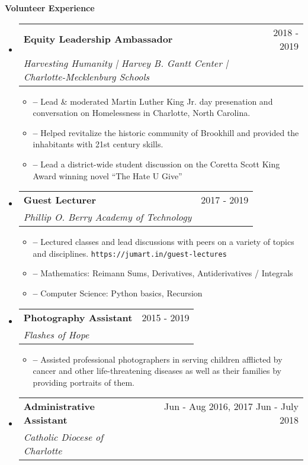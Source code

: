 \documentclass[letterpaper,10pt,draft]{article}
\makeatletter
\newlength{\outerbordwidth}
\newcommand{\resitem}[1]{\item[] \textbf{--} #1 \vspace{-2pt}}
\newcommand{\resheading}[1]{\vspace{8pt}
  {\setlength{\FrameSep}{\outerbordwidth}
    
\textbf{\large #1}
    
  }
}
\newcommand{\ressubheading}[3]{
\begin{tabular*}{6.5in}{l@{\cftdotfill{\cftsecdotsep}\extracolsep{\fill}}r}
		\textbf{#1} & #3\\
		\textit{#2} \\
\end{tabular*}\vspace{-6pt}}
\makeatother
\begin{document}
\resheading{Volunteer Experience}
\begin{itemize}

	\item[]
	  \ressubheading{Equity Leadership Ambassador}{Harvesting Humanity | Harvey B. Gantt Center | Charlotte-Mecklenburg Schools}{2018 - 2019}

	  \begin{itemize}

	    \resitem{Lead \& moderated Martin Luther King Jr. day presenation and conversation on Homelessness in Charlotte, North Carolina.}

	    \resitem{Helped revitalize the historic community of Brookhill and provided the inhabitants with 21st century skills.}

	    \resitem{Lead a district-wide student discussion on the Coretta Scott King Award winning novel ``The Hate U Give''}

	   \end{itemize}

	\item[]
	  \ressubheading{Guest Lecturer}{Phillip O. Berry Academy of Technology}{2017 - 2019}

	  \begin{itemize}

	    \resitem{Lectured classes and lead discussions with peers on a variety of topics and disciplines. \texttt{https://jumart.in/guest-lectures}}

	    \resitem{Mathematics: Reimann Sums, Derivatives, Antiderivatives / Integrals}

	    \resitem{Computer Science: Python basics, Recursion}

	  \end{itemize}
	\item[]
		\ressubheading{Photography Assistant}{Flashes of Hope}{2015 - 2019}

		\begin{itemize}

			\resitem{Assisted professional photographers in serving children afflicted by cancer and other life-threatening diseases as well as their families by providing portraits of them. }

		\end{itemize}

	\item[]

		\ressubheading{Administrative Assistant}{Catholic Diocese of Charlotte}{Jun - Aug 2016, 2017 Jun - July 2018}


\end{itemize}
\end{document}
